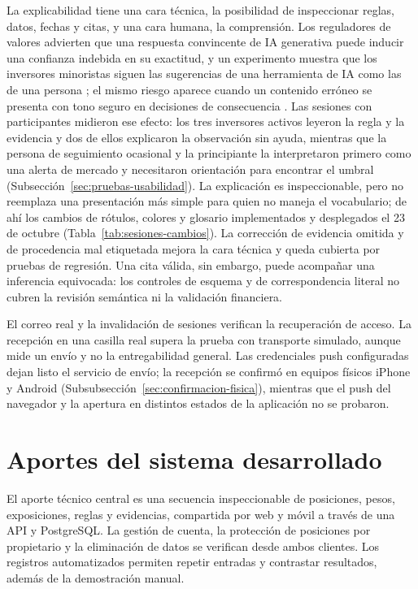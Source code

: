 La explicabilidad tiene una cara técnica, la posibilidad de inspeccionar reglas, datos, fechas y citas, y una cara humana, la comprensión. Los reguladores de valores advierten que una respuesta convincente de IA generativa puede inducir una confianza indebida en su exactitud, y un experimento muestra que los inversores minoristas siguen las sugerencias de una herramienta de IA como las de una persona \parencite{IOSCO2025ai,OSC2024ai}; el mismo riesgo aparece cuando un contenido erróneo se presenta con tono seguro en decisiones de consecuencia \parencite{NIST2024genai}. Las sesiones con participantes midieron ese efecto: los tres inversores activos leyeron la regla y la evidencia y dos de ellos explicaron la observación sin ayuda, mientras que la persona de seguimiento ocasional y la principiante la interpretaron primero como una alerta de mercado y necesitaron orientación para encontrar el umbral (Subsección~\ref{sec:pruebas-usabilidad}). La explicación es inspeccionable, pero no reemplaza una presentación más simple para quien no maneja el vocabulario; de ahí los cambios de rótulos, colores y glosario implementados y desplegados el 23 de octubre (Tabla~\ref{tab:sesiones-cambios}). La corrección de evidencia omitida y de procedencia mal etiquetada mejora la cara técnica y queda cubierta por pruebas de regresión. Una cita válida, sin embargo, puede acompañar una inferencia equivocada: los controles de esquema y de correspondencia literal no cubren la revisión semántica ni la validación financiera.

El correo real y la invalidación de sesiones verifican la recuperación de acceso. La recepción en una casilla real supera la prueba con transporte simulado, aunque mide un envío y no la entregabilidad general. Las credenciales push configuradas dejan listo el servicio de envío; la recepción se confirmó en equipos físicos iPhone y Android (Subsubsección~\ref{sec:confirmacion-fisica}), mientras que el push del navegador y la apertura en distintos estados de la aplicación no se probaron.

\section{Aportes del sistema desarrollado}\label{sec:aportes}

El aporte técnico central es una secuencia inspeccionable de posiciones, pesos, exposiciones, reglas y evidencias, compartida por web y móvil a través de una API y PostgreSQL. La gestión de cuenta, la protección de posiciones por propietario y la eliminación de datos se verifican desde ambos clientes. Los registros automatizados permiten repetir entradas y contrastar resultados, además de la demostración manual.

